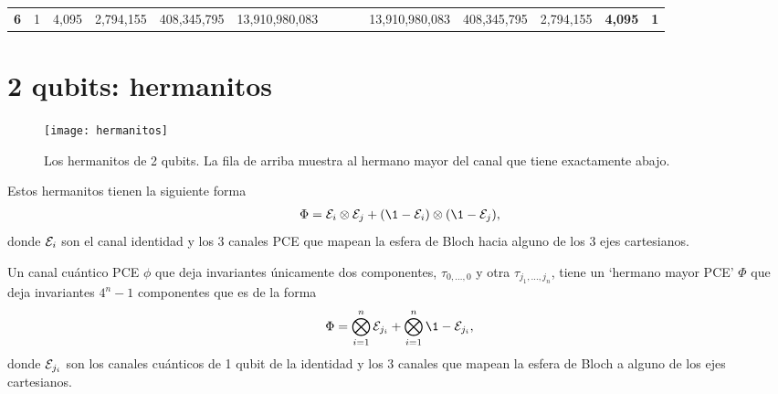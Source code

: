 \begin{table}[h!]
\begin{tabular}{llllccccccclll}
{\color[HTML]{FF0000} \textbf{6}} & \multicolumn{1}{c}{1} & \multicolumn{1}{c}{4,095} & \multicolumn{1}{c}{2,794,155}  & 408,345,795          & 13,910,980,083                     & \multicolumn{1}{l}{}                 & \multicolumn{1}{l}{}                   & \multicolumn{1}{l}{}                    & \cellcolor[HTML]{FCE5CD}13,910,980,083  & \cellcolor[HTML]{CFE2F3}408,345,795 & \multicolumn{1}{c}{\cellcolor[HTML]{FCE5CD}2,794,155} & \multicolumn{1}{c}{\textbf{4,095}} & \multicolumn{1}{c}{\textbf{1}}
\end{tabular}
\end{table}

\section{2 qubits: hermanitos}
\begin{figure}[H]
  \centering
  \texttt{[image: hermanitos]}
  \caption{Los hermanitos de 2 qubits. La fila de arriba muestra al hermano 
  mayor del canal que tiene exactamente abajo.}
  \label{•}
\end{figure}

Estos hermanitos tienen la siguiente forma
\begin{align}
\Phi=\E_i\ot \E_j+\qty(\1-\E_i)\ot \qty(\1-\E_j),
\end{align}
donde $\mathcal{E}_i$ son el canal identidad y los 3 canales PCE que mapean 
la esfera de Bloch hacia alguno de los 3 ejes cartesianos.

Un canal cuántico PCE $\phi$ que deja invariantes únicamente 
dos componentes, $\tau_{0,\ldots,0}$ y otra $\tau_{j_1,\ldots,j_n}$,
tiene un `hermano mayor PCE' $\Phi$ que deja invariantes $4^n-1$
componentes que es de la forma
\begin{align}
\Phi=\bigotimes_{i=1}^n\E_{j_i}+\bigotimes_{i=1}^{n}\1 -\E_{j_i},
\end{align}
donde $\mathcal{E}_{j_i}$ son los canales cuánticos de 1 qubit de la identidad
y los 3 canales que mapean la esfera de Bloch a alguno de los ejes 
cartesianos.
